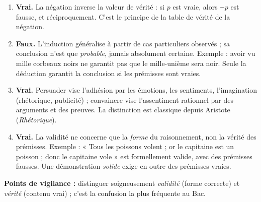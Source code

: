 \documentclass[11pt]{article}
\newcommand{\cle}[1]{{\popxbold\color{popdark}#1}}
\begin{document}
\begin{corrige}
\begin{enumerate}
\item \textbf{Vrai.} La négation inverse la valeur de vérité : si $p$ est vraie, alors $\neg p$ est fausse, et réciproquement. C'est le principe de la table de vérité de la négation.
\item \textbf{Faux.} L'induction généralise à partir de cas particuliers observés ; sa conclusion n'est que \emph{probable}, jamais absolument certaine. Exemple : avoir vu mille corbeaux noirs ne garantit pas que le mille-unième sera noir. Seule la déduction garantit la conclusion si les prémisses sont vraies.
\item \textbf{Vrai.} \cle{Persuader} vise l'adhésion par les émotions, les sentiments, l'imagination (rhétorique, publicité) ; \cle{convaincre} vise l'assentiment rationnel par des arguments et des preuves. La distinction est classique depuis Aristote (\emph{Rhétorique}).
\item \textbf{Vrai.} La validité ne concerne que la \emph{forme} du raisonnement, non la vérité des prémisses. Exemple : « Tous les poissons volent ; or le capitaine est un poisson ; donc le capitaine vole » est formellement valide, avec des prémisses fausses. Une démonstration \emph{solide} exige en outre des prémisses vraies.
\end{enumerate}
\textbf{Points de vigilance :} distinguer soigneusement \emph{validité} (forme correcte) et \emph{vérité} (contenu vrai) ; c'est la confusion la plus fréquente au Bac.
\end{corrige}
\end{document}
